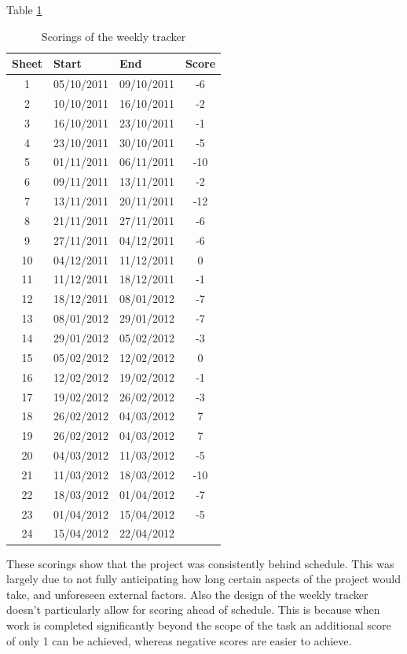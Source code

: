 Table \ref{tab:scorings}

\begin{table}[H]
	\centering
	\begin{tabular}[c]{| c | l | l | c |}
		\hline
		Sheet	& Start	& End	& Score \\
		\hline
		1	& 05/10/2011	& 09/10/2011	& -6	\\
		2	& 10/10/2011	& 16/10/2011	& -2	\\
		3	& 16/10/2011	& 23/10/2011	& -1	\\
		4	& 23/10/2011	& 30/10/2011	& -5	\\
		5	& 01/11/2011	& 06/11/2011	& -10	\\
		6	& 09/11/2011	& 13/11/2011	& -2	\\
		7	& 13/11/2011	& 20/11/2011	& -12	\\
		8	& 21/11/2011	& 27/11/2011	& -6	\\
		9	& 27/11/2011	& 04/12/2011	& -6	\\
		10	& 04/12/2011	& 11/12/2011	& 0	\\
		11	& 11/12/2011	& 18/12/2011	& -1	\\
		12	& 18/12/2011	& 08/01/2012	& -7	\\
		13	& 08/01/2012	& 29/01/2012	& -7	\\
		14	& 29/01/2012	& 05/02/2012	& -3	\\
		15	& 05/02/2012	& 12/02/2012	& 0	\\
		16	& 12/02/2012	& 19/02/2012	& -1	\\
		17	& 19/02/2012	& 26/02/2012	& -3	\\
		18	& 26/02/2012	& 04/03/2012	& 7	\\
		19	& 26/02/2012	& 04/03/2012	& 7	\\
		20	& 04/03/2012	& 11/03/2012	& -5	\\
		21	& 11/03/2012	& 18/03/2012	& -10	\\
		22	& 18/03/2012	& 01/04/2012	& -7	\\
		23	& 01/04/2012	& 15/04/2012	& -5	\\
		24	& 15/04/2012	& 22/04/2012	& 	\\
		\hline
	\end{tabular}
	\caption{Scorings of the weekly tracker}
	\label{tab:scorings}
\end{table}

These scorings show that the project was consistently behind schedule.
This was largely due to not fully anticipating how long certain aspects of the project would take, and unforeseen external factors.
Also the design of the weekly tracker doesn't particularly allow for scoring ahead of schedule.
This is because when work is completed significantly beyond the scope of the task an additional score of only 1 can be achieved, whereas negative scores are easier to achieve.


